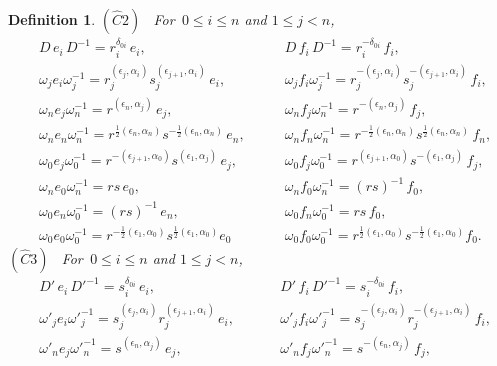 \documentclass{amsproc}
\newtheorem{defi}[theo]{Definition}
\theoremstyle{remark}
\numberwithin{equation}{section}
\begin{document}
\begin{defi}
{\noindent
$(\hat{C}2)$ \ \textit{For} $\,0 \leqslant i \leqslant n$
\textit{and} $1\leqslant j<n$,
\begin{equation*}\begin{array}{lll}
&D\,e_i\,D^{-1}=r_i^{\delta_{0i}}\,e_i,\qquad\qquad\quad
&D\,f_i\,D^{-1}=r_i^{-\delta_{0i}}\,f_i,\\
&\omega_je_i\omega_j^{-1}=r_j^{(\epsilon_j,
\alpha_i)}s_j^{(\epsilon_{j+1}, \alpha_i )}\,e_i,~~~~~~~~~~~
&\omega_jf_i\omega_j^{-1}=r_j^{-(\epsilon_j,
\alpha_i)}s_j^{-(\epsilon_{j+1},\alpha_i)}\,f_i,\\
&\omega_n e_j\omega_n^{-1}=r^{(\epsilon_n,
\alpha_j)}\,e_j,
&\omega_n f_j\omega_n^{-1}=r^{-(\epsilon_n,
\alpha_j)}\,f_j,\\
&\omega_ne_n\omega_n^{-1}=r^{\frac{1}{2}(\epsilon_n,
\alpha_n)}s^{-\frac{1}{2}(\epsilon_n, \alpha_n)}\,e_n,~~~~~~~~~
&\omega_nf_n\omega_n^{-1}=r^{-\frac{1}{2}(\epsilon_n,
\alpha_n)}s^{\frac{1}{2}(\epsilon_n, \alpha_n)}\,f_n,\\
&\omega_0e_j\omega_0^{-1}=r^{-(\epsilon_{j+1}, \alpha_0)}
s^{(\epsilon_1, \alpha_j)}\,e_j,
& \omega_0f_j\omega_0^{-1}=r^{(\epsilon_{j+1}, \alpha_0 )}
s^{-(\epsilon_1, \alpha_j)}\,f_j ,\\
&\omega_n e_0\omega_n^{-1}=rs\, e_0,~~~~~~~
&\omega_n f_0\omega_n^{-1}=(rs)^{-1}\,f_0 ,\\
&\omega_0e_n\omega_0^{-1}=(rs)^{-1}\,e_n,~~~~~~
&\omega_0f_n\omega_0^{-1}=rs \,f_0 ,\\
&\omega_0e_0\omega_0^{-1}=r^{-\frac{1}{2}(\epsilon_1,
\alpha_0)}s^{\frac{1}{2}(\epsilon_1, \alpha_0)}e_0 ~~~~~~
&\omega_0f_0\omega_0^{-1}=r^{\frac{1}{2}(\epsilon_1,
\alpha_0)}s^{-\frac{1}{2}(\epsilon_1, \alpha_0)}f_0 .
\end{array}\end{equation*}
$(\hat{C}3)$ \ \textit{For} $\,0 \leqslant i \leqslant n$
\textit{and}
 $1\leqslant j<n$,
\begin{equation*}\begin{array}{lll}
 &D'\,e_i\,D'^{-1}=s_i^{\delta_{0i}}\,e_i,\qquad\qquad\quad
&D'\,f_i\,D'^{-1}=s_i^{-\delta_{0i}}\,f_i,\\
&\omega'_je_i{\omega'}_j^{-1}=s_j^{(\epsilon_j,
\alpha_i)}r_j^{(\epsilon_{j+1}, \alpha_i )}\,e_i,~~~~~~~~~~~
&\omega'_jf_i{\omega'}_j^{-1}=s_j^{-(\epsilon_j,
\alpha_i)}r_j^{-(\epsilon_{j+1},\alpha_i)}\,f_i,\\
&\omega'_n e_j{\omega'}_n^{-1}=s^{(\epsilon_n,
\alpha_j)}\,e_j,
&\omega'_n f_j{\omega'}_n^{-1}=s^{-(\epsilon_n,
\alpha_j)}\,f_j,\\

\end{array}
\end{equation*}}
\end{defi}
\end{document}
